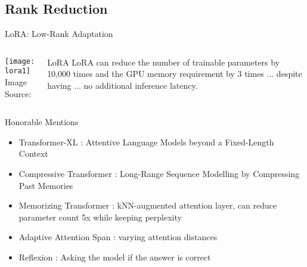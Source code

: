 \subsection{Rank Reduction}
\begin{frame}[c]{LoRA: Low-Rank Adaptation}
    \begin{columns}
        \begin{minipage}[c][\textheight][c]{\linewidth}
            \texttt{[image: lora1]} \\
            Image Source: \cite{hu_lora_2021}
        \end{minipage}
        \begin{minipage}[c][.8\textheight][c]{\linewidth}
            \large
            \begin{aquote}{LoRA \cite{hu_lora_2021}}
                LoRA can reduce the number of trainable parameters by 10,000
                times and the GPU memory requirement by 3 times ... despite
                having ... no additional inference latency.
            \end{aquote}
        \end{minipage}
    \end{columns}
\end{frame}

\begin{frame}[c]{Honorable Mentions}
    \begin{itemize}[<+(1)->]
        \item Transformer-XL \cite{dai_transformerxl_2019}: Attentive Language Models beyond a Fixed-Length Context
        \item Compressive Transformer \cite{rae_compressive_2019}: Long-Range Sequence Modelling by Compressing Past Memories
        \item Memorizing Transformer \cite{wu_memorizing_2022}: kNN-augmented attention layer, can reduce parameter count 5x while keeping perplexity
        \item Adaptive Attention Span \cite{sukhbaatar_adaptive_2019}: varying attention distances
        \item Reflexion \cite{shinn_reflexion_2023}: Asking the model if the answer is correct
    \end{itemize}
\end{frame}

